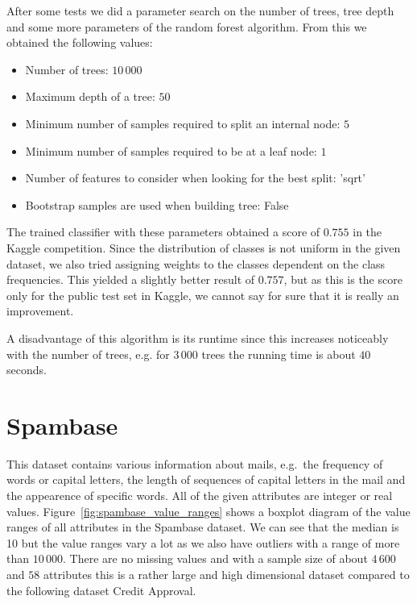 \documentclass[a4paper,11pt]{article}
\begin{document}
        After some tests we did a parameter search on the number of trees, tree depth and some more parameters of the random forest algorithm. From this we obtained the following values:
        \begin{itemize}
            \item Number of trees: $10\,000$
            \item Maximum depth of a tree: $50$
            \item Minimum number of samples required to split an internal node: $5$
            \item Minimum number of samples required to be at a leaf node: $1$
            \item Number of features to consider when looking for the best split: 'sqrt'
            \item Bootstrap samples are used when building tree: False
        \end{itemize}
        
        The trained classifier with these parameters obtained a score of $0.755$ in the Kaggle competition. Since the distribution of classes is not uniform in the given dataset, we also tried assigning weights to the classes dependent on the class frequencies. This yielded a slightly better result of $0.757$, but as this is the score only for the public test set in Kaggle, we cannot say for sure that it is really an improvement.
        
        A disadvantage of this algorithm is its runtime since this increases noticeably with the number of trees, e.g. for $3\,000$ trees the running time is about $40$ seconds.

\section{Spambase}
    This dataset contains various information about mails, e.g.\ the frequency of words or capital letters, the length of sequences of capital letters in the mail and the appearence of specific words. All of the given attributes are integer or real values. Figure~\ref{fig:spambase_value_ranges} shows a boxplot diagram of the value ranges of all attributes in the Spambase dataset. We can see that the median is 10 but the value ranges vary a lot as we also have outliers with a range of more than $10\,000$. There are no missing values and with a sample size of about $4\,600$ and $58$ attributes this is a rather large and high dimensional dataset compared to the following dataset Credit Approval.
    
\end{document}
